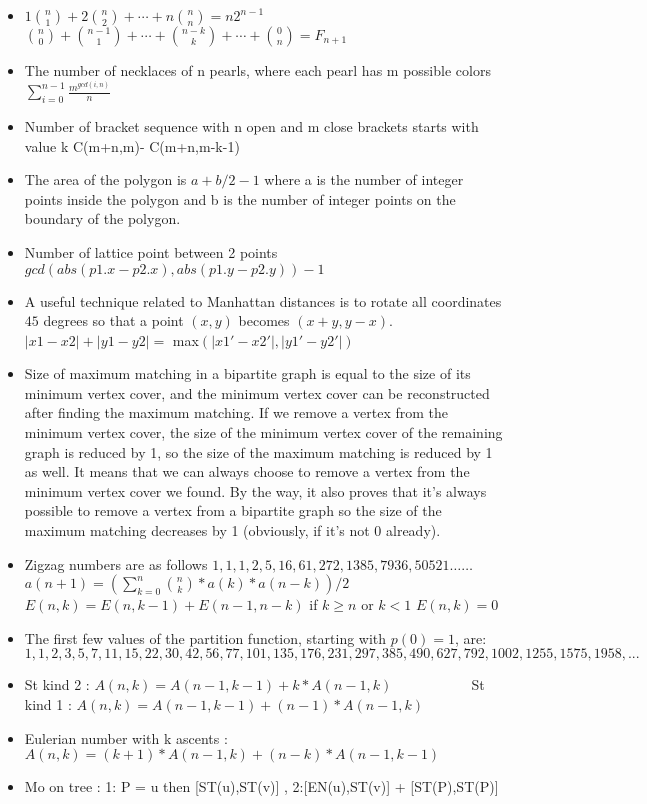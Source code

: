 \begin{itemize}
\item $1 \binom n 1 + 2 \binom n 2 + \cdots + n \binom n n = n 2^{n-1}$ ~~~~~~~~~~~~~~~~~~~~~~~~~~ $\binom n 0 + \binom {n-1} 1 + \cdots + \binom {n-k} k + \cdots + \binom 0 n = F_{n+1}$
\item The number of necklaces of n pearls, where
each pearl has m possible colors $\sum_{i=0}^{n-1} \frac{m^{gcd(i,n)}}{n}$
\item Number of bracket sequence with n open and m close brackets starts with value k
C(m+n,m)- C(m+n,m-k-1)
\item The area of the polygon is
$a+ b/2 - 1 $
where a is the number of integer points inside the polygon and b is the number
of integer points on the boundary of the polygon.
\item Number of lattice point between 2 points 
$gcd( abs(p1.x- p2.x) ,abs(p1.y- p2.y) )-1$
\item A useful technique related to Manhattan distances is to rotate all coordinates
$45$ degrees so that a point $(x, y)$ becomes $(x+ y, y- x)$.
$|x1-x2| + |y1-y2| = $ max$(|x1' - x2'| , |y1' - y2'|)$
\item Size of maximum matching in a bipartite graph is equal to the size of its minimum vertex cover, 
and the minimum vertex cover can be reconstructed after finding the maximum matching. 
If we remove a vertex from the minimum vertex cover, the size of the minimum vertex cover 
of the remaining graph is reduced by 1, so the size of the maximum matching is reduced by 1 as well.
It means that we can always choose to remove a vertex from the minimum vertex cover we found. By the way,
it also proves that it's always possible to remove a vertex from a bipartite graph so the size of the
maximum matching decreases by 1 (obviously, if it's not 0 already).
\item Zigzag numbers are as follows $1, 1, 1, 2, 5, 16, 61, 272, 1385, 7936, 50521 …… $ \\
$a(n+1) = (\sum_{k=0}^{n} {n\choose k} * a(k) * a(n-k))/2$\\
$E(n,k) = E(n,k-1) + E(n-1,n-k)$ if $k\geq n$ or $k<1$ $E(n,k) = 0$
\item The first few values of the partition function, starting with $p(0) = 1$, are:\\
$1, 1, 2, 3, 5, 7, 11, 15, 22, 30, 42, 56, 77, 101, 135, 176, 231, 297, 385, 490, 627, 792, 1002, 1255, 1575, 1958,... $
\item St kind 2 :  $ A(n,k) = A(n-1,k-1) + k*A(n-1,k)$ ~~~~~~~~~~ St kind 1 :  $ A(n,k) = A(n-1,k-1) + (n-1)*A(n-1,k)$
\item Eulerian number with k ascents : $A(n,k) = (k+1)*A(n-1,k) + (n-k)*A(n-1,k-1)$
\item Mo on tree : 1: P = u then [ST(u),ST(v)] , 2:[EN(u),ST(v)] + [ST(P),ST(P)] 
\end{itemize}

